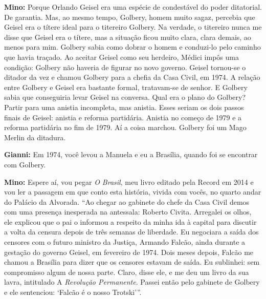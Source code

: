 \textbf{Mino:} Porque Orlando Geisel era uma espécie de condestável do
poder ditatorial. De garantia. Mas, ao mesmo tempo, Golbery, homem muito
sagaz, percebia que Geisel era o títere ideal para o titereiro Golbery.
Na verdade, o titereiro nunca me disse que Geisel era o títere, mas a
situação ficou muito clara, clara demais, ao menos para mim. Golbery
sabia como dobrar o homem e conduzi-lo pelo caminho que havia traçado.
Ao aceitar Geisel como seu herdeiro, Médici impôs uma condição: Golbery
não haveria de figurar no novo governo. Geisel tornou-se o ditador da
vez e chamou Golbery para a chefia da Casa Civil, em 1974. A relação
entre Golbery e Geisel era bastante formal, tratavam-se de senhor. E
Golbery sabia que conseguiria levar Geisel na conversa. Qual era o plano
do Golbery? Partir para uma anistia incompleta, mas anistia. Esses
seriam os dois passos finais de Geisel: anistia e reforma partidária.
Anistia no começo de 1979 e a reforma partidária no fim de 1979. Aí a
coisa marchou. Golbery foi um Mago Merlin da ditadura.

\textbf{Gianni:} Em 1974, você levou a Manuela e eu a Brasília, quando
foi se encontrar com Golbery.

\textbf{Mino:} Espere aí, vou pegar \emph{O Brasil}, meu livro editado
pela Record em 2014 e vou ler a passagem em que conto esta história,
vivida com vocês, no quarto andar do Palácio da Alvorada. ``Ao chegar ao
gabinete do chefe da Casa Civil demos com uma presença inesperada na
antessala: Roberto Civita. Arregalei os olhos, ele explicou que o pai o
informou a respeito da minha ida à capital para discutir a volta da
censura depois de três semanas de liberdade. Eu negociara a saída dos
censores com o futuro ministro da Justiça, Armando Falcão, ainda durante
a gestação do governo Geisel, em fevereiro de 1974. Dois meses depois,
Falcão me chamou a Brasília para dizer que os censores estavam de saída.
Eu sublinhei: sem compromisso algum de nossa parte. Claro, disse ele, e
me deu um livro da sua lavra, intitulado A \emph{Revolução Permanente}.
Passei então pelo gabinete de Golbery e ele sentenciou: `Falcão é o
nosso Trotski'''.

